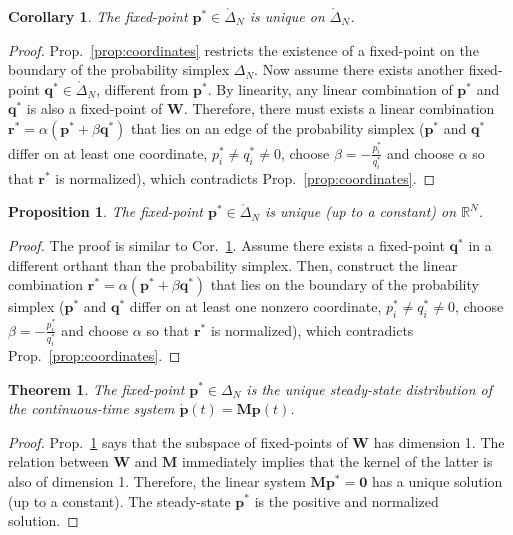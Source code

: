 \documentclass{article}
\newtheorem{theorem}{Theorem}
\newtheorem{proposition}{Proposition}
\newtheorem{corollary}{Corollary}
\theoremstyle{remark}
\begin{document}
    \begin{corollary}
    \label{cor:unique}
        The fixed-point $\mathbf{p}^*\in \mathring\Delta_N$ is unique on $\mathring\Delta_N$.
    \end{corollary}

    \begin{proof}
        Prop.~\ref{prop:coordinates} restricts the existence of a fixed-point on the boundary of the probability simplex $\Delta_N$. Now assume there exists another fixed-point $\mathbf{q}^*\in \mathring\Delta_N$, different from $\mathbf{p}^*$. By linearity, any linear combination of $\mathbf{p}^*$ and $\mathbf{q}^*$ is also a fixed-point of $\mathbf{W}$. Therefore, there must exists a linear combination $\mathbf{r}^* = \alpha(\mathbf{p}^* + \beta\mathbf{q}^*)$ that lies on an edge of the probability simplex ($\mathbf{p}^*$ and $\mathbf{q}^*$ differ on at least one coordinate, $p^*_i\neq q^*_i \neq 0$, choose $\beta = -\frac{p^*_i}{q^*_i}$ and choose $\alpha$ so that $\mathbf{r}^*$ is normalized), which contradicts Prop.~\ref{prop:coordinates}. 
    \end{proof}

    \begin{proposition}
    \label{prop:unique}
        The fixed-point $\mathbf{p}^*\in \mathring\Delta_N$ is unique (up to a constant) on $\mathbb{R}^N$.
    \end{proposition}

    \begin{proof}
        The proof is similar to Cor.~\ref{cor:unique}. Assume there exists a fixed-point $\mathbf{q}^*$ in a different orthant than the probability simplex. Then, construct the linear combination $\mathbf{r}^* = \alpha(\mathbf{p}^* + \beta\mathbf{q}^*)$ that lies on the boundary of the probability simplex ($\mathbf{p}^*$ and $\mathbf{q}^*$ differ on at least one nonzero coordinate, $p^*_i\neq q^*_i \neq 0$, choose $\beta = -\frac{p^*_i}{q^*_i}$ and choose $\alpha$ so that $\mathbf{r}^*$ is normalized), which contradicts Prop.~\ref{prop:coordinates}.
    \end{proof}

    \begin{theorem}
        The fixed-point $\mathbf{p}^*\in \Delta_N$ is the unique steady-state distribution of the continuous-time system $\dot{\mathbf{p}}(t) = \mathbf{M}\mathbf{p}(t)$.
    \end{theorem}
    
    \begin{proof}
        Prop.~\ref{prop:unique} says that the subspace of fixed-points of $\mathbf{W}$ has dimension 1. The relation between $\mathbf{W}$ and $\mathbf{M}$ immediately implies that the kernel of the latter is also of dimension 1. Therefore, the linear system $\mathbf{M}\mathbf{p}^* = \mathbf{0}$ has a unique solution (up to a constant). The steady-state $\mathbf{p}^*$ is the positive and normalized solution.
    \end{proof}
\end{document}
